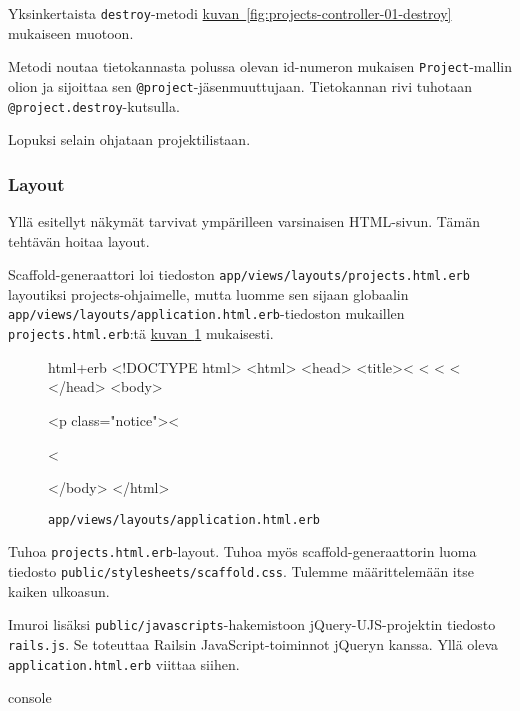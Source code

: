 \documentclass{article}
\newenvironment{myfigure}[1][tbp]{
  \begin{figure}[#1]
    \centering
    \begin{lrbox}{\myfigurebox}
      \begin{minipage}{\textwidth}
}{
      \end{minipage}
    \end{lrbox}
    \colorbox{blue!4}{\usebox{\myfigurebox}}
  \end{figure}
}
\newcommand{\myref}[2]{\hyperref[#2]{#1~\ref*{#2}}}
\newcommand{\pdfforeignlanguage}[2]{\texorpdfstring{\foreignlanguage{#1}{#2}}{#2}}
\newcommand{\eng}[1]{\pdfforeignlanguage{english}{#1}}
\begin{document}
Yksinkertaista \texttt{destroy}-metodi
\myref{kuvan}{fig:projects-controller-01-destroy} mukaiseen muotoon.

Metodi noutaa tietokannasta polussa olevan id-numeron mukaisen
\texttt{Project}-mallin olion ja sijoittaa sen
\texttt{@project}-jäsenmuuttujaan. Tietokannan rivi tuhotaan
\texttt{@project.destroy}-kutsulla.

Lopuksi selain ohjataan projektilistaan.

\subsubsection{\eng{Layout}}

Yllä esitellyt näkymät tarvivat ympärilleen varsinaisen HTML-sivun. Tämän
tehtävän hoitaa \eng{layout}.

\begin{samepage}
\eng{Scaffold}-generaattori loi tiedoston
\texttt{app/views/layouts/projects.html.erb} layoutiksi projects-ohjaimelle,
mutta luomme sen sijaan globaalin
\texttt{app/views/layouts/application.html.erb}-tiedoston mukaillen
\texttt{projects.html.erb}:tä \myref{kuvan}{fig:application-layout-00}
mukaisesti.

\begin{myfigure}[H]
\caption{\texttt{app/views/layouts/application.html.erb}}
\label{fig:application-layout-00}

\begin{pygmented}{html+erb}
<!DOCTYPE html>
<html>
<head>
  <title><%
  <%
  <%
  <%
</head>
<body>

<p class="notice"><%

<%

</body>
</html>
\end{pygmented}
\end{myfigure}
\end{samepage}

\begin{samepage}
Tuhoa \texttt{projects.html.erb}-layout. Tuhoa myös
\eng{scaffold}-generaattorin luoma tiedosto
\texttt{public/stylesheets/scaffold.css}. Tulemme määrittelemään itse kaiken
ulkoasun.

Imuroi lisäksi \texttt{public/javascripts}-hakemistoon jQuery-UJS-projektin
tiedosto \texttt{rails.js}. Se toteuttaa Railsin JavaScript-toiminnot jQueryn
kanssa. Yllä oleva \texttt{application.html.erb} viittaa siihen.

\begin{pygmented}{console}
\end{pygmented}
\end{samepage}
\end{document}
